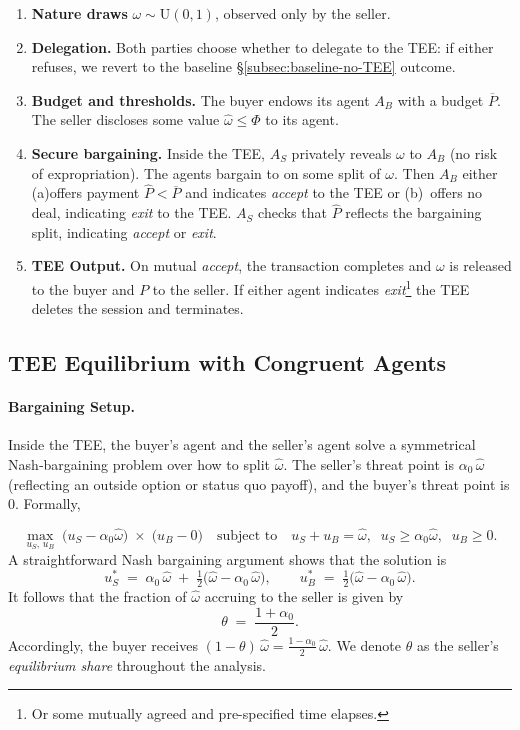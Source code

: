 \documentclass{article}
\begin{document}
\begin{enumerate}[label=(\arabic*)]
\item \textbf{Nature draws} $\omega\sim\text{U}(0,1)$, observed only by the seller.
\item \textbf{Delegation.}  Both parties choose whether to delegate to the TEE:
  if either refuses, we revert to the baseline \S\ref{subsec:baseline-no-TEE} outcome.
\item \textbf{Budget and thresholds.}  The buyer endows its agent $A_B$ with a budget
  $\overline{P}$. The seller discloses some value $\hat{\omega} \le \Phi$ to its agent.
\item \textbf{Secure bargaining.} Inside the TEE, $A_S$ privately reveals $\omega$
  to $A_B$ (no risk of expropriation). The agents bargain to on some split of $\omega$. Then $A_B$ either (a)offers payment $\hat P < \overline{P}$ and indicates \emph{accept} to the TEE or (b)~offers no deal, indicating \emph{exit} to the TEE. $A_S$ checks that $\hat P$ reflects the bargaining split, indicating \emph{accept} or \emph{exit}. 
  \item \textbf{TEE Output.} On mutual \emph{accept}, the transaction completes and $\omega$ is released to the buyer and $P$ to the seller. If either agent indicates \emph{exit}\footnote{Or some mutually agreed and pre-specified time elapses.} the TEE deletes the session and terminates.
\end{enumerate}

\subsection{TEE Equilibrium with Congruent Agents}
\paragraph{Bargaining Setup.}
Inside the TEE, the buyer’s agent and the seller’s agent solve a symmetrical
Nash‐bargaining problem over how to split $\hat{\omega}$.  The seller’s
threat point is $\alpha_0\,\hat{\omega}$ (reflecting an outside option or
status quo payoff), and the buyer’s threat point is $0$. Formally,

\[
  \max_{u_S,\,u_B}\;\bigl(u_S - \alpha_0 \hat{\omega}\bigr)\;\times\;\bigl(u_B - 0\bigr)
  \quad\text{subject to}\quad
  u_S + u_B = \hat{\omega},\;\;
  u_S \ge \alpha_0 \hat{\omega},\;\;
  u_B \ge 0.
\]
A straightforward Nash bargaining argument shows that the solution is
\[
  u_S^* 
  \;=\; \alpha_0\,\hat{\omega} 
        \;+\; \tfrac12\bigl(\hat{\omega} - \alpha_0\,\hat{\omega}\bigr),
  \qquad
  u_B^* 
  \;=\; \tfrac12\bigl(\hat{\omega} - \alpha_0\,\hat{\omega}\bigr).
\]
It follows that the fraction of \(\hat{\omega}\) accruing to the seller is given by
\begin{equation}\label{eq:theta_definition}
  \theta 
  \;=\; 
  \frac{1 + \alpha_0}{2}.
\end{equation}
Accordingly, the buyer receives \( (1-\theta)\,\hat{\omega} = \tfrac{1-\alpha_0}{2}\,\hat{\omega}\).
We denote \(\theta\) as the seller’s \emph{equilibrium share} throughout the analysis. 
\end{document}

